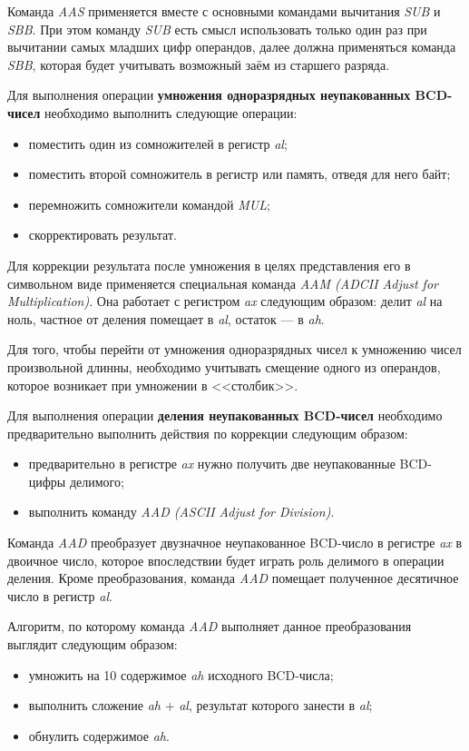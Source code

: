 Команда \textit{AAS} применяется вместе с основными командами вычитания \textit{SUB} и \textit{SBB}.
При этом команду \textit{SUB} есть смысл использовать только один раз при вычитании самых
младших цифр операндов, далее должна применяться команда \textit{SBB}, которая будет учитывать
возможный заём из старшего разряда.

Для выполнения операции \textbf{умножения одноразрядных неупакованных BCD-чисел} необходимо
выполнить следующие операции:
\begin{itemize}
  \item поместить один из сомножителей в регистр \textit{al};
  \item поместить второй сомножитель в регистр или память, отведя для него байт;
  \item перемножить сомножители командой \textit{MUL};
  \item скорректировать результат.
\end{itemize}

Для коррекции результата после умножения в целях представления его в символьном виде
применяется специальная команда \textit{AAM (ADCII Adjust for Multiplication)}. Она
работает с регистром \textit{ax} следующим образом: делит \textit{al} на ноль, частное
от деления помещает в \textit{al}, остаток --- в \textit{ah}.

Для того, чтобы перейти от умножения одноразрядных чисел к умножению чисел произвольной
длинны, необходимо учитывать смещение одного из операндов, которое возникает при
умножении в <<столбик>>.

Для выполнения операции \textbf{деления неупакованных BCD-чисел} необходимо предварительно
выполнить действия по коррекции следующим образом:
\begin{itemize}
  \item предварительно в регистре \textit{ax} нужно получить две неупакованные
    BCD-цифры делимого;
  \item выполнить команду \textit{AAD (ASCII Adjust for Division)}.
\end{itemize}

Команда \textit{AAD} преобразует двузначное неупакованное BCD-число в регистре \textit{ax}
в двоичное число, которое впоследствии будет играть роль делимого в операции деления.
Кроме преобразования, команда \textit{AAD} помещает полученное десятичное число в регистр \textit{al}.

Алгоритм, по которому команда \textit{AAD} выполняет данное преобразования выглядит следующим образом:
\begin{itemize}
  \item умножить на 10 содержимое \textit{ah} исходного BCD-числа;
  \item выполнить сложение \textit{ah} + \textit{al}, результат которого занести в \textit{al};
  \item обнулить содержимое \textit{ah}.
\end{itemize}

